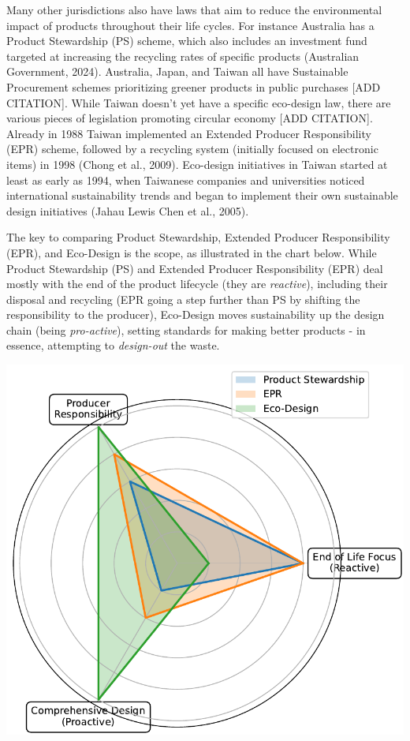 \documentclass[
  letterpaper,
  DIV=11,
  numbers=noendperiod]{scrartcl}
\begin{document}
Many other jurisdictions also have laws that aim to reduce the
environmental impact of products throughout their life cycles. For
instance Australia has a Product Stewardship (PS) scheme, which also
includes an investment fund targeted at increasing the recycling rates
of specific products (Australian Government, 2024). Australia, Japan,
and Taiwan all have Sustainable Procurement schemes prioritizing greener
products in public purchases {[}ADD CITATION{]}. While Taiwan doesn't
yet have a specific eco-design law, there are various pieces of
legislation promoting circular economy {[}ADD CITATION{]}. Already in
1988 Taiwan implemented an Extended Producer Responsibility (EPR)
scheme, followed by a recycling system (initially focused on electronic
items) in 1998 (Chong et al., 2009). Eco-design initiatives in Taiwan
started at least as early as 1994, when Taiwanese companies and
universities noticed international sustainability trends and began to
implement their own sustainable design initiatives (Jahau Lewis Chen et
al., 2005).

The key to comparing Product Stewardship, Extended Producer
Responsibility (EPR), and Eco-Design is the scope, as illustrated in the
chart below. While Product Stewardship (PS) and Extended Producer
Responsibility (EPR) deal mostly with the end of the product lifecycle
(they are \emph{reactive}), including their disposal and recycling (EPR
going a step further than PS by shifting the responsibility to the
producer), Eco-Design moves sustainability up the design chain (being
\emph{pro-active}), setting standards for making better products - in
essence, attempting to \emph{design-out} the waste.

\includegraphics{_thesis_files/figure-pdf/cell-20-output-1.pdf}
\end{document}
